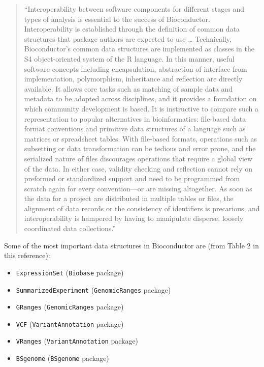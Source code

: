 \documentclass[]{tufte-book}
\providecommand{\tightlist}{%
  \setlength{\itemsep}{0pt}\setlength{\parskip}{0pt}}
\begin{document}
\begin{quote}
``Interoperability between software components for different stages and types
of analysis is essential to the success of Bioconductor. Interoperability is
established through the definition of common data structures that package
authors are expected to use \ldots{} Technically, Bioconductor's common data
structures are implemented as classes in the S4 object-oriented system of the R
language. In this manner, useful software concepts including encapsulation,
abstraction of interface from implementation, polymorphism, inheritance and
reflection are directly available. It allows core tasks such as matching of
sample data and metadata to be adopted across disciplines, and it provides a
foundation on which community development is based. It is instructive to compare
such a representation to popular alternatives in bioinformatics: file-based data
format conventions and primitive data structures of a language such as matrices
or spreadsheet tables. With file-based formats, operations such as subsetting or
data transformation can be tedious and error prone, and the serialized nature of
files discourages operations that require a global view of the data. In either
case, validity checking and reflection cannot rely on preformed or standardized
support and need to be programmed from scratch again for every convention---or are
missing altogether. As soon as the data for a project are distributed in
multiple tables or files, the alignment of data records or the consistency of
identifiers is precarious, and interoperability is hampered by having to
manipulate disperse, loosely coordinated data collections.''
\citep{huber2015orchestrating}
\end{quote}

Some of the most important data structures in Bioconductor are \citep{huber2015orchestrating} (from Table 2 in this reference):

\begin{itemize}
\tightlist
\item
  \texttt{ExpressionSet} (\texttt{Biobase} package)
\item
  \texttt{SummarizedExperiment} (\texttt{GenomicRanges} package)
\item
  \texttt{GRanges} (\texttt{GenomicRanges} package)
\item
  \texttt{VCF} (\texttt{VariantAnnotation} package)
\item
  \texttt{VRanges} (\texttt{VariantAnnotation} package)
\item
  \texttt{BSgenome} (\texttt{BSgenome} package)
\end{itemize}
\end{document}
